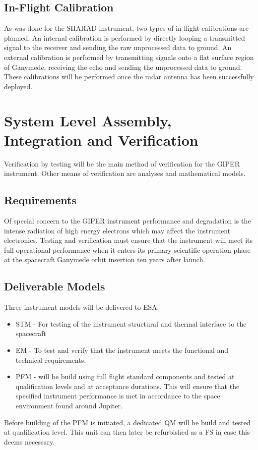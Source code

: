 \subsection{In-Flight Calibration}
As was done for the SHARAD instrument\cite{SHARAD_ppt}, two types of in-flight calibrations are planned. An internal calibration is performed by directly looping a transmitted signal to the receiver and sending the raw unprocessed data to ground. An external calibration is performed by transmitting signals onto a flat surface region of Ganymede, receiving the echo and sending the unprocessed data to ground. These calibrations will be performed once the radar antenna has been successfully deployed.
%
%
\section{System Level Assembly, Integration and Verification}
%
Verification by testing will be the main method of verification for the \ac{GIPER} instrument. Other means of verification are analyses and mathematical models.  
%
\subsection{Requirements}
Of special concern to the \ac{GIPER} instrument performance and degradation is the intense radiation of high energy electrons which may affect the instrument electronics. Testing and verification must ensure that the instrument will meet its full operational performance when it enters its primary scientific operation phase at the spacecraft Ganymede orbit insertion ten years after launch.
%
\subsection{Deliverable Models}
%
Three instrument models will be delivered to ESA:
%
\begin{itemize}
\item \ac{STM} - For testing of the instrument structural and thermal interface to the spacecraft\\
\item \ac{EM} - To test and verify that the instrument meets the functional and technical requirements.\\
\item \ac{PFM} - will be build using full flight standard components and tested at qualification levels and at acceptance durations. This will ensure that the specified instrument performance is met in accordance to the space environment found around Jupiter.
\end{itemize}
%
Before building of the \ac{PFM} is initiated, a dedicated \ac{QM} will be build and tested at qualification level. This unit can then later be refurbished as a \ac{FS} in case this deems necessary.
